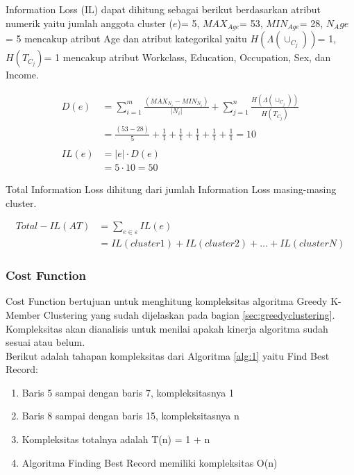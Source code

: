 \vspace{0.4cm}

\noindent Information Loss (IL) dapat dihitung sebagai berikut berdasarkan atribut numerik yaitu jumlah anggota cluster ($e$)= 5, $MAX_{Age}$= 53, $MIN_{Age}$= 28, $N_Age$= 5 mencakup atribut Age dan atribut kategorikal yaitu $H(\Lambda(\cup_{C_j}))$= 1, $H(T_{C_j})$= 1 mencakup atribut Workclass, Education, Occupation, Sex, dan Income.

\begin{align*}
D(e) &= \sum_{i=1}^{m} \frac{(MAX_{N_i} - MIN_{N_i})}{|N_i|} + \sum_{j=1}^{n}\frac{H(\Lambda(\cup_{C_j}))}{H(T_{C_j})}\\
&= \frac{(53 - 28)}{5} + \frac{1}{1}+\frac{1}{1}+\frac{1}{1}+\frac{1}{1}+\frac{1}{1} = 10\\\\
IL(e) &= |e| \cdot D(e)\\
&= 5 \cdot 10 = 50
\end{align*}

\noindent Total Information Loss dihitung dari jumlah Information Loss masing-masing cluster.

\begin{align*}
Total-IL(AT) &= \sum_{e \in \varepsilon}^{}  IL(e)\\
&= IL(cluster1)+IL(cluster2)+\ldots+IL(clusterN)
\end{align*}

\subsubsection{Cost Function}
Cost Function bertujuan untuk menghitung kompleksitas algoritma Greedy K-Member Clustering yang sudah dijelaskan pada bagian \ref{sec:greedyclustering}. Kompleksitas akan dianalisis untuk menilai apakah kinerja algoritma sudah sesuai atau belum.\\

\noindent Berikut adalah tahapan kompleksitas dari Algoritma \ref{alg:1} yaitu Find Best Record: 

\begin{enumerate}
\item Baris 5 sampai dengan baris 7, kompleksitasnya 1
\item Baris 8 sampai dengan baris 15, kompleksitasnya n 
\item Kompleksitas totalnya adalah T(n) = 1 + n
\item Algoritma Finding Best Record memiliki kompleksitas O(n)
\end{enumerate}

